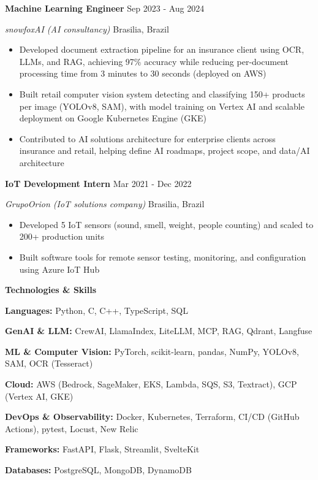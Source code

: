 \documentclass[a4paper,10pt]{article}
\begin{document}
\vspace{4pt}

\textbf{Machine Learning Engineer} \hfill Sep 2023 - Aug 2024

\textit{snowfoxAI (AI consultancy)} \hfill Brasilia, Brazil
\begin{itemize}[noitemsep, topsep=0pt, partopsep=0pt, parsep=0pt]
    \item Developed document extraction pipeline for an insurance client using OCR, LLMs, and RAG, achieving 97\% accuracy while reducing per-document processing time from 3 minutes to 30 seconds (deployed on AWS)
    \item Built retail computer vision system detecting and classifying 150+ products per image (YOLOv8, SAM), with model training on Vertex AI and scalable deployment on Google Kubernetes Engine (GKE)
    \item Contributed to AI solutions architecture for enterprise clients across insurance and retail, helping define AI roadmaps, project scope, and data/AI architecture
\end{itemize}

\vspace{4pt}

\textbf{IoT Development Intern} \hfill Mar 2021 - Dec 2022

\textit{GrupoOrion (IoT solutions company)} \hfill Brasilia, Brazil
\begin{itemize}[noitemsep, topsep=0pt, partopsep=0pt, parsep=0pt]
    \item Developed 5 IoT sensors (sound, smell, weight, people counting) and scaled to 200+ production units
    \item Built software tools for remote sensor testing, monitoring, and configuration using Azure IoT Hub
\end{itemize}

\begin{center}
    \textbf{Technologies \& Skills}
\end{center}

\textbf{Languages:} Python, C, C++, TypeScript, SQL

\textbf{GenAI \& LLM:} CrewAI, LlamaIndex, LiteLLM, MCP, RAG, Qdrant, Langfuse

\textbf{ML \& Computer Vision:} PyTorch, scikit-learn, pandas, NumPy, YOLOv8, SAM, OCR (Tesseract)

\textbf{Cloud:} AWS (Bedrock, SageMaker, EKS, Lambda, SQS, S3, Textract), GCP (Vertex AI, GKE)

\textbf{DevOps \& Observability:} Docker, Kubernetes, Terraform, CI/CD (GitHub Actions), pytest, Locust, New Relic

\textbf{Frameworks:} FastAPI, Flask, Streamlit, SvelteKit

\textbf{Databases:} PostgreSQL, MongoDB, DynamoDB
\end{document}

